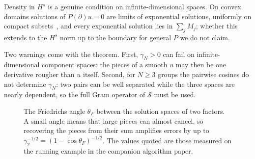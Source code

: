 \documentclass[11pt]{article}
\theoremstyle{plain}
\theoremstyle{definition}
\theoremstyle{remark}
\newcommand{\sumop}{\mathcal{S}}            %
\newcommand{\cF}{c_{F}}                     %
\newcommand{\thetaF}{\theta_{F}}            %
\newcommand{\gN}{\gamma_{N}}                %
\newcommand{\Hs}{H^{s}}                     %
\newcommand{\roleinalg}[1]{\par\noindent\emph{Role in the algorithm.} #1\par}
\renewcommand{\roleinalg}[1]{}
\begin{document}
Density in $\Hs$ is a genuine condition on infinite-dimensional spaces. On convex domains solutions of
$P(\partial)u=0$ are limits of exponential solutions, uniformly on compact subsets~\cite{Mal56,Hor90},
and every exponential solution lies in $\sum_jM_j$; whether this extends to the $\Hs$ norm up to the boundary
for general $P$ we do not claim.

Two warnings come with the theorem. First, $\gN>0$ can fail on infinite-dimensional component spaces: the pieces of a smooth $u$ may then be
one derivative rougher than $u$ itself. Second, for $N\ge3$ groups the pairwise cosines do not
determine $\gN$: two pairs can be well separated while the three spaces are nearly dependent, so the
full Gram operator of $\sumop$ must be used.

\begin{figure}[tbp]
\centering
{}
\caption{The Friedrichs angle $\thetaF$ between the solution spaces of two factors. A small angle
means that large pieces can almost cancel, so recovering the pieces from their sum amplifies errors by
up to $\gamma_2^{-1/2}=(1-\cos\thetaF)^{-1/2}$. The values quoted are those measured on the running
example in the companion algorithm paper.}\label{fig:friedrichs}
\end{figure}

\roleinalg{$\gN$ is computed on the sampled kernel bases and reported with every result.
It enters twice: as the error amplification $\gN^{-1/2}$ of the components, and through the Bayesian
split layer (the companion algorithm paper), whose credible intervals widen and whose split probability
returns to the prior as $\thetaF\to0$. A small angle is therefore never hidden: it shows up as wide
intervals, not as a confident but wrong split.}
\end{document}
